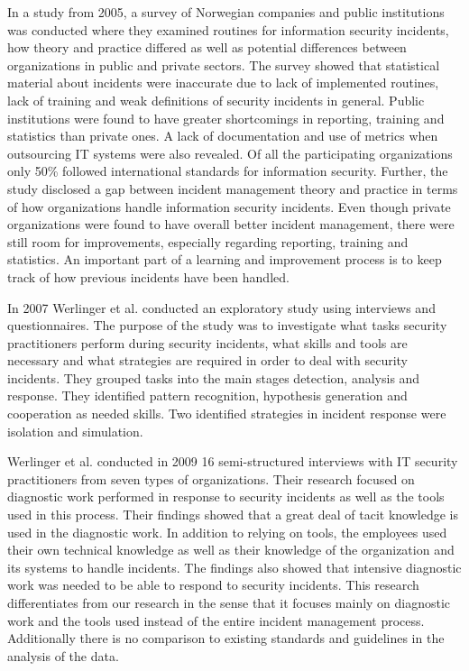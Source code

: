 In a study from 2005\cite{brage}, a survey of Norwegian companies and public institutions was conducted where they examined routines for information security incidents, how theory and practice differed as well as potential differences between organizations in public and private sectors. The survey showed that statistical material about incidents were inaccurate due to lack of implemented routines, lack of training and weak definitions of security incidents in general. Public institutions were found to have greater shortcomings in reporting, training and statistics than private ones. A lack of documentation and use of metrics when outsourcing IT systems were also revealed. Of all the participating organizations only 50\% followed international standards for information security. Further, the study disclosed a gap between incident management theory and practice in terms of how organizations handle information security incidents. Even though private organizations were found to have overall better incident management, there were still room for improvements, especially regarding reporting, training and statistics. An important part of a learning and improvement process is to keep track of how previous incidents have been handled. 

In 2007 Werlinger et al. \cite{werlinger2007detecting} conducted an exploratory study using interviews and questionnaires. The purpose of the study was to investigate what tasks security practitioners perform during security incidents, what skills and tools are necessary and what strategies are required in order to deal with security incidents. They grouped tasks into the main stages detection, analysis and response. They identified pattern recognition, hypothesis generation and cooperation as needed skills. Two identified strategies in incident response were isolation and simulation. 

Werlinger et al. \cite{werlinger2010preparation} conducted in 2009 16 semi-structured interviews with IT security practitioners from seven types of organizations. Their research focused on diagnostic work performed in response to security incidents as well as the tools used in this process. Their findings showed that a great deal of tacit knowledge is used in the diagnostic work. In addition to relying on tools, the employees used their own technical knowledge as well as their knowledge of the organization and its systems to handle incidents. The findings also showed that intensive diagnostic work was needed to be able to respond to security incidents. This research differentiates from our research in the sense that it focuses mainly on diagnostic work and the tools used instead of the entire incident management process. Additionally there is no comparison to existing standards and guidelines in the analysis of the data.

